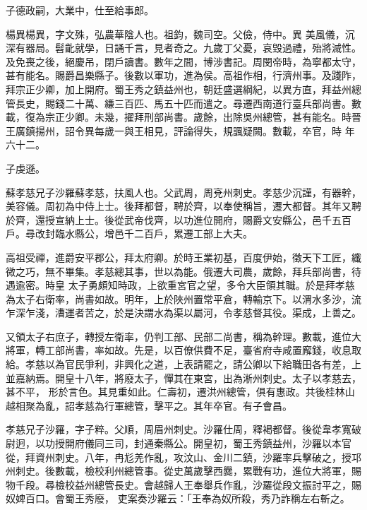 \begin{pinyinscope}
 子德政嗣，大業中，仕至給事郎。



 楊異楊異，字文殊，弘農華陰人也。祖鈞，魏司空。父儉，侍中。異
 美風儀，沉深有器局。髫齔就學，日誦千言，見者奇之。九歲丁父憂，哀毀過禮，殆將滅性。及免喪之後，絕慶吊，閉戶讀書。數年之間，博涉書記。周閔帝時，為寧都太守，甚有能名。賜爵昌樂縣子。後數以軍功，進為侯。高祖作相，行濟州事。及踐阼，拜宗正少卿，加上開府。蜀王秀之鎮益州也，朝廷盛選綱紀，以異方直，拜益州總管長史，賜錢二十萬、縑三百匹、馬五十匹而遣之。尋遷西南道行臺兵部尚書。數載，復為宗正少卿。未幾，擢拜刑部尚書。歲餘，出除吳州總管，甚有能名。時晉王廣鎮揚州，詔令異每歲一與王相見，評論得失，規諷疑闕。數載，卒官，時
 年六十二。



 子虔遜。



 蘇孝慈兄子沙羅蘇孝慈，扶風人也。父武周，周兗州刺史。孝慈少沉謹，有器幹，美容儀。周初為中侍上士。後拜都督，聘於齊，以奉使稱旨，遷大都督。其年又聘於齊，還授宣納上士。後從武帝伐齊，以功進位開府，賜爵文安縣公，邑千五百戶。尋改封臨水縣公，增邑千二百戶，累遷工部上大夫。



 高祖受禪，進爵安平郡公，拜太府卿。於時王業初基，百度伊始，徵天下工匠，纖微之巧，無不畢集。孝慈總其事，世以為能。俄遷大司農，歲餘，拜兵部尚書，待遇逾密。時皇
 太子勇頗知時政，上欲重宮官之望，多令大臣領其職。於是拜孝慈為太子右衛率，尚書如故。明年，上於陜州置常平倉，轉輸京下。以渭水多沙，流乍深乍淺，漕運者苦之，於是決謂水為渠以屬河，令孝慈督其役。渠成，上善之。



 又領太子右庶子，轉授左衛率，仍判工部、民部二尚書，稱為幹理。數載，進位大將軍，轉工部尚書，率如故。先是，以百僚供費不足，臺省府寺咸置廨錢，收息取給。孝慈以為官民爭利，非興化之道，上表請罷之，請公卿以下給職田各有差，上並嘉納焉。開皇十八年，將廢太子，憚其在東宮，出為淅州刺史。太子以孝慈去，甚不平，
 形於言色。其見重如此。仁壽初，遷洪州總管，俱有惠政。共後桂林山越相聚為亂，詔孝慈為行軍總管，擊平之。其年卒官。有子會昌。



 孝慈兄子沙羅，字子粹。父順，周眉州刺史。沙羅仕周，釋褐都督。後從韋孝寬破尉迥，以功授開府儀同三司，封通秦縣公。開皇初，蜀王秀鎮益州，沙羅以本官從，拜資州刺史。八年，冉尨羌作亂，攻汶山、金川二鎮，沙羅率兵擊破之，授邛州刺史。後數載，檢校利州總管事。從史萬歲擊西爨，累戰有功，進位大將軍，賜物千段。尋檢校益州總管長史。會越歸人王奉舉兵作亂，沙羅從段文振討平之，賜奴婢百口。會蜀王秀廢，
 吏案奏沙羅云：「王奉為奴所殺，秀乃詐稱左右斬之。




\end{pinyinscope}
